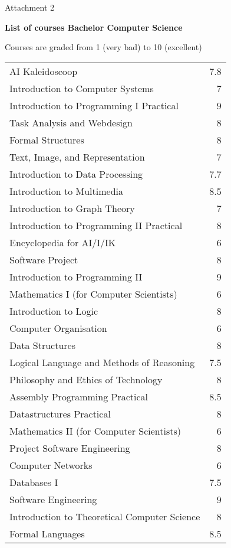 \documentclass[a4paper,11pt]{article}
\begin{document}
\begin{cv}{}
\pagebreak


\begin{cvlist}{Attachment 2}
  \item {\bf List of courses Bachelor Computer Science}
  \item Courses are graded from 1 (very bad) to 10 (excellent)
  \item
  \begin{tabular}{p{23em}d}
    AI Kaleidoscoop & 7.8\\
    Introduction to Computer Systems & 7\\
    Introduction to Programming I Practical & 9\\
    Task Analysis and Webdesign & 8\\
    Formal Structures & 8\\
    Text, Image, and Representation & 7\\
    Introduction to Data Processing & 7.7\\
    Introduction to Multimedia & 8.5\\
    Introduction to Graph Theory & 7\\
    Introduction to Programming II Practical & 8\\
    Encyclopedia for AI/I/IK & 6\\
    Software Project & 8\\
    Introduction to Programming II & 9\\
    Mathematics I (for Computer Scientists) & 6\\
    Introduction to Logic & 8\\
    Computer Organisation & 6\\
    Data Structures & 8\\
    Logical Language and Methods of Reasoning & 7.5\\
    Philosophy and Ethics of Technology & 8\\
    Assembly Programming Practical & 8.5\\
    Datastructures Practical & 8\\
    Mathematics II (for Computer Scientists) & 6\\
    Project Software Engineering & 8\\
    Computer Networks & 6\\
    Databases I & 7.5\\
    Software Engineering & 9\\
    Introduction to Theoretical Computer Science & 8\\
    Formal Languages & 8.5\\

\end{tabular}
\end{cvlist}
\end{cv}
\end{document}
